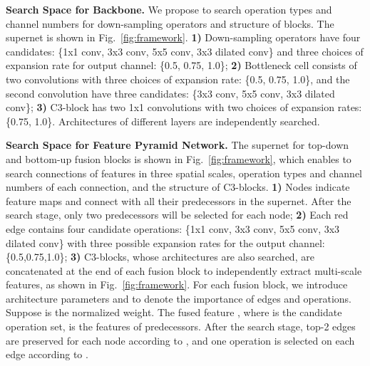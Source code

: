 \documentclass[letterpaper]{article} \usepackage{aaai22}  \usepackage{times}  \usepackage{helvet}  \usepackage{courier}  \usepackage[hyphens]{url}  \usepackage{graphicx} \urlstyle{rm} \def\UrlFont{\rm}  \usepackage{natbib}  \usepackage{caption} \DeclareCaptionStyle{ruled}{labelfont=normalfont,labelsep=colon,strut=off} \frenchspacing  \setlength{\pdfpagewidth}{8.5in}  \setlength{\pdfpageheight}{11in}
\begin{document}
\textbf{Search Space for Backbone.}
We propose to search operation types and channel numbers for down-sampling operators and structure of blocks. The supernet is shown in Fig.~\ref{fig:framework}.
\textbf{1)} Down-sampling operators have
four candidates: \{1x1 conv, 3x3 conv, 5x5 conv, 3x3 dilated conv\} and three choices of expansion rate for output channel: \{0.5, 0.75, 1.0\};
\textbf{2)} Bottleneck cell consists of two convolutions with three choices of expansion rate: \{0.5, 0.75, 1.0\}, and the second convolution have three candidates: \{3x3 conv, 5x5 conv, 3x3 dilated conv\};
\textbf{3)} C3-block has two 1x1 convolutions with two choices of expansion rates: \{0.75, 1.0\}.
Architectures of different layers are independently searched. \begin{comment}
Suppose a backbone has  down-sampling layers,  C3-blocks and  Bottlenecks, 
We introduce architecture parameters  to represent the importance of candidates for down-sampling layers, C3-blocks, and bottleneck modules respectively.
\end{comment}


\textbf{Search Space for Feature Pyramid Network.}
The supernet for top-down and bottom-up fusion blocks is shown in Fig.~\ref{fig:framework}, which enables to search connections of features in three spatial scales, operation types and channel numbers of each connection, and the structure of C3-blocks. \textbf{1)} Nodes indicate feature maps and connect with all their predecessors in the supernet. After the search stage, only two predecessors will be selected for each node; \textbf{2)} Each red edge contains four candidate operations: \{1x1 conv, 3x3 conv, 5x5 conv, 3x3 dilated conv\} with three possible expansion rates for the output channel: \{0.5,0.75,1.0\}; 
\textbf{3)} C3-blocks, whose architectures are also searched, are concatenated at the end of each fusion block to independently extract multi-scale features, as shown in Fig.~\ref{fig:framework}.
For each fusion block, we introduce architecture parameters  and  to denote the importance of edges and operations. Suppose  is the normalized weight.
The fused feature ,
where  is the candidate operation set,  is the features of predecessors. 
After the search stage, top-2 edges are preserved for each node according to , and one operation is selected on each edge according to .

\begin{comment}
Suppose FPN owns  fusion blocks,  C3 blocks, and  bottlenecks.
We introduce parameters  to represent importance of candidate architectures, where .
\end{comment}
\end{document}
